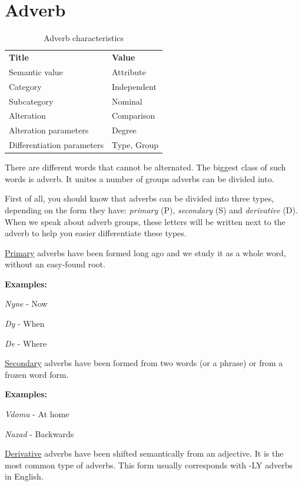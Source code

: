 \section{Adverb}

\begin{table}[h]
	\caption{Adverb characteristics}
	\begin{tabular}{ll}
		\textbf{Title}              & \textbf{Value}      \\
		Semantic value              & Attribute           \\
		Category                    & Independent         \\
		Subcategory                 & Nominal             \\
		Alteration                  & Comparison          \\
		Alteration parameters       & Degree              \\
		Differentiation parameters  & Type, Group
	\end{tabular}
\end{table}

There are different words that cannot be alternated. The biggest class of such words is adverb. It unites a number of groups adverbs can be divided into.

First of all, you should know that adverbs can be divided into three types, depending on the form they have: \textit{primary} (P), \textit{secondary} (S) and \textit{derivative} (D). When we speak about adverb groups, these letters will be written next to the adverb to help you easier differentiate these types.

\underline{Primary} adverbs have been formed long ago and we study it as a whole word, without an easy-found root.

\textbf{Examples:}

\textit{Nyne} - Now

\textit{Dy} - When

\textit{De} - Where

\underline{Secondary} adverbs have been formed from two words (or a phrase) or from a frozen word form. 

\textbf{Examples:}

\textit{Vdomu} - At home

\textit{Nazad} - Backwards

\underline{Derivative} adverbs have been shifted semantically from an adjective. It is the most common type of adverbs. This form usually corresponds with -LY adverbs in English.

